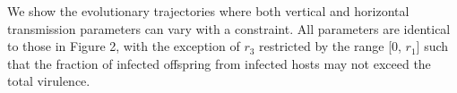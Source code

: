 We show the evolutionary trajectories where both vertical and horizontal transmission parameters can vary with a constraint. All parameters are identical to those in Figure 2, with the exception of $r_3$ restricted by the range [0, $r_1$] such that the fraction of infected offspring from infected hosts may not exceed the total virulence.

\begin{figure}[tbp]
    \centering
    \hfil

    \medskip
    \hfil


\end{figure}
